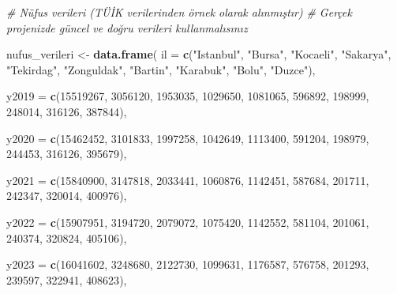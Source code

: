 \documentclass[
]{article}
\newenvironment{Shaded}{\begin{snugshade}}{\end{snugshade}}
\newcommand{\AttributeTok}[1]{\textcolor[rgb]{0.13,0.29,0.53}{#1}}
\newcommand{\CommentTok}[1]{\textcolor[rgb]{0.56,0.35,0.01}{\textit{#1}}}
\newcommand{\DecValTok}[1]{\textcolor[rgb]{0.00,0.00,0.81}{#1}}
\newcommand{\FunctionTok}[1]{\textcolor[rgb]{0.13,0.29,0.53}{\textbf{#1}}}
\newcommand{\NormalTok}[1]{#1}
\newcommand{\OtherTok}[1]{\textcolor[rgb]{0.56,0.35,0.01}{#1}}
\newcommand{\StringTok}[1]{\textcolor[rgb]{0.31,0.60,0.02}{#1}}
\begin{document}
\begin{Shaded}
\begin{Highlighting}[]
\CommentTok{\# Nüfus verileri (TÜİK verilerinden örnek olarak alınmıştır)}
\CommentTok{\# Gerçek projenizde güncel ve doğru verileri kullanmalısınız}

\NormalTok{nufus\_verileri }\OtherTok{\textless{}{-}} \FunctionTok{data.frame}\NormalTok{(}
  \AttributeTok{il =} \FunctionTok{c}\NormalTok{(}\StringTok{"Istanbul"}\NormalTok{, }\StringTok{"Bursa"}\NormalTok{, }\StringTok{"Kocaeli"}\NormalTok{, }\StringTok{"Sakarya"}\NormalTok{, }\StringTok{"Tekirdag"}\NormalTok{, }
         \StringTok{"Zonguldak"}\NormalTok{, }\StringTok{"Bartin"}\NormalTok{, }\StringTok{"Karabuk"}\NormalTok{, }\StringTok{"Bolu"}\NormalTok{, }\StringTok{"Duzce"}\NormalTok{),}
  
  \AttributeTok{y2019 =} \FunctionTok{c}\NormalTok{(}\DecValTok{15519267}\NormalTok{, }\DecValTok{3056120}\NormalTok{, }\DecValTok{1953035}\NormalTok{, }\DecValTok{1029650}\NormalTok{, }\DecValTok{1081065}\NormalTok{,}
            \DecValTok{596892}\NormalTok{, }\DecValTok{198999}\NormalTok{, }\DecValTok{248014}\NormalTok{, }\DecValTok{316126}\NormalTok{, }\DecValTok{387844}\NormalTok{),}
  
  \AttributeTok{y2020 =} \FunctionTok{c}\NormalTok{(}\DecValTok{15462452}\NormalTok{, }\DecValTok{3101833}\NormalTok{, }\DecValTok{1997258}\NormalTok{, }\DecValTok{1042649}\NormalTok{, }\DecValTok{1113400}\NormalTok{,}
            \DecValTok{591204}\NormalTok{, }\DecValTok{198979}\NormalTok{, }\DecValTok{244453}\NormalTok{, }\DecValTok{316126}\NormalTok{, }\DecValTok{395679}\NormalTok{),}
  
  \AttributeTok{y2021 =} \FunctionTok{c}\NormalTok{(}\DecValTok{15840900}\NormalTok{, }\DecValTok{3147818}\NormalTok{, }\DecValTok{2033441}\NormalTok{, }\DecValTok{1060876}\NormalTok{, }\DecValTok{1142451}\NormalTok{,}
            \DecValTok{587684}\NormalTok{, }\DecValTok{201711}\NormalTok{, }\DecValTok{242347}\NormalTok{, }\DecValTok{320014}\NormalTok{, }\DecValTok{400976}\NormalTok{),}
  
  \AttributeTok{y2022 =} \FunctionTok{c}\NormalTok{(}\DecValTok{15907951}\NormalTok{, }\DecValTok{3194720}\NormalTok{, }\DecValTok{2079072}\NormalTok{, }\DecValTok{1075420}\NormalTok{, }\DecValTok{1142552}\NormalTok{,}
            \DecValTok{581104}\NormalTok{, }\DecValTok{201061}\NormalTok{, }\DecValTok{240374}\NormalTok{, }\DecValTok{320824}\NormalTok{, }\DecValTok{405106}\NormalTok{),}
  
  \AttributeTok{y2023 =} \FunctionTok{c}\NormalTok{(}\DecValTok{16041602}\NormalTok{, }\DecValTok{3248680}\NormalTok{, }\DecValTok{2122730}\NormalTok{, }\DecValTok{1099631}\NormalTok{, }\DecValTok{1176587}\NormalTok{,}
            \DecValTok{576758}\NormalTok{, }\DecValTok{201293}\NormalTok{, }\DecValTok{239597}\NormalTok{, }\DecValTok{322941}\NormalTok{, }\DecValTok{408623}\NormalTok{),}
  

\end{Highlighting}
\end{Shaded}
\end{document}
